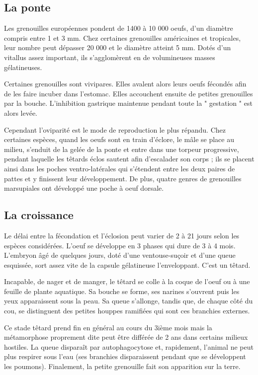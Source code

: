  
\subsection{La ponte}

Les grenouilles européennes pondent de 1400 à 10 000 oeufs, d’un diamètre compris entre 1 et 3 mm. 
Chez certaines grenouilles américaines et tropicales, leur nombre peut dépasser 20 000 et le diamètre atteint 5 mm. 
Dotés d’un vitallus assez important, ils s’agglomèrent en de volumineuses masses gélatineuses.

Certaines grenouilles sont vivipares. 
Elles avalent alors leurs oeufs fécondés afin de les faire incuber dans l’estomac. 
Elles accouchent ensuite de petites grenouilles par la bouche. 
L’inhibition gastrique maintenue pendant toute la " gestation " est alors levée.

Cependant l’oviparité est le mode de reproduction le plus répandu. 
Chez certaines espèces, quand les oeufs sont en train d’éclore, le mâle se place au milieu, s’enduit de la gelée de la ponte et entre dans une torpeur progressive, pendant laquelle les têtards éclos sautent afin d’escalader son corps ; ils se placent ainsi dans les poches ventro-latérales qui s’étendent entre les deux paires de pattes et y finissent leur développement. 
De plus, quatre genres de grenouilles marsupiales ont développé une poche à oeuf dorsale.

         

\subsection{La croissance}

Le délai entre la fécondation et l’éclosion peut varier de 2 à 21 jours selon les espèces considérées. 
L’oeuf se développe en 3 phases qui dure de 3 à 4 mois. 
L’embryon âgé de quelques jours, doté d’une ventouse-suçoir et d’une queue esquissée, sort assez vite de la capsule gélatineuse l’enveloppant. 
C’est un têtard.

Incapable, de nager et de manger, le têtard se colle à la coque de l’oeuf ou à une feuille de plante aquatique. 
Sa bouche se forme, ses narines s’ouvrent puis les yeux apparaissent sous la peau. 
Sa queue s’allonge, tandis que, de chaque côté du cou, se distinguent des petites houppes ramifiées qui sont ces branchies externes.

Ce stade têtard prend fin en général au cours du 3ième mois mais la métamorphose proprement dite peut être différée de 2 ans dans certains milieux hostiles. 
La queue disparaît par autophagocytose et, rapidement, l’animal ne peut plus respirer sous l’eau (ses branchies disparaissent pendant que se développent les poumons).
Finalement, la petite grenouille fait son apparition sur la terre.

